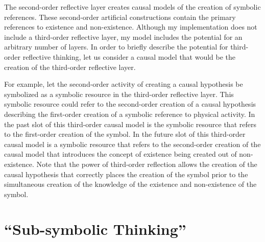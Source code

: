The second-order reflective layer creates causal models of the
creation of symbolic references.  These second-order artificial
constructions contain the primary references to existence and
non-existence.  Although my implementation does not include a
third-order reflective layer, my model includes the potential for an
arbitrary number of layers.  In order to briefly describe the
potential for third-order reflective thinking, let us consider a
causal model that would be the creation of the third-order reflective
layer.

For example, let the second-order activity of creating a causal
hypothesis be symbolized as a symbolic resource in the third-order
reflective layer.  This symbolic resource could refer to the
second-order creation of a causal hypothesis describing the
first-order creation of a symbolic reference to physical activity.  In
the past slot of this third-order causal model is the symbolic
resource that refers to the first-order creation of the symbol.  In
the future slot of this third-order causal model is a symbolic
resource that refers to the second-order creation of the causal model
that introduces the concept of existence being created out of
non-existence.  Note that the power of third-order reflection allows
the creation of the causal hypothesis that correctly places the
creation of the symbol prior to the simultaneous creation of the
knowledge of the existence and non-existence of the symbol.

\section{``Sub-symbolic Thinking''}

